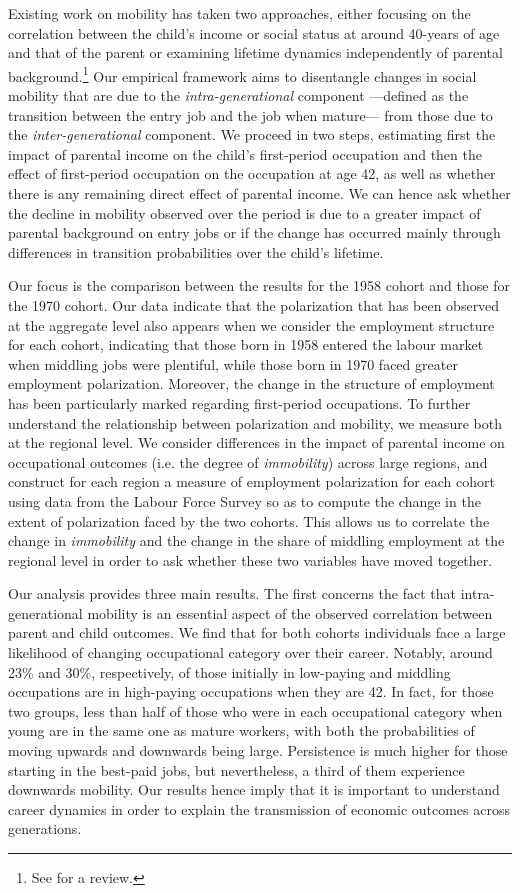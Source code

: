 Existing work on mobility has taken two approaches, either focusing on the correlation between the child's income or social status at around 40-years of age and that of the parent or examining lifetime dynamics independently of parental background.\footnote{See \citet{Jantti2015Income} for a review.} Our empirical framework aims to disentangle changes in social mobility that are due to the \textit{intra-generational} component ---defined as the transition between the entry job and the job when mature--- from those due to the \textit{inter-generational} component. We proceed in two steps, estimating first the impact of parental income on the child's first-period occupation and then the effect of first-period occupation on the occupation at age 42, as well as whether there is any remaining direct effect of parental income. We can hence ask whether the decline in mobility observed over the period is due to a greater impact of parental background on entry jobs or if the change has occurred mainly through differences in transition probabilities over the child's lifetime. 

Our focus is the comparison between the results for the 1958 cohort and those for the 1970 cohort. Our data indicate that the polarization that has been observed at the aggregate level also appears when we consider the employment structure for each cohort, indicating that those born in 1958 entered the labour market when middling jobs were plentiful, while those born in 1970 faced greater employment polarization. Moreover, the change in the structure of employment has been particularly marked regarding first-period occupations. To further understand the relationship between polarization and mobility, we measure both at the regional level. We consider differences in the impact of parental income on occupational outcomes (i.e. the degree of \emph{immobility}) across large regions, and construct for each region a measure of employment polarization for each cohort using data from the Labour Force Survey so as to compute the change in the extent of polarization faced by the two cohorts. This allows us to correlate the change in \emph{immobility} and the change in the share of middling employment at the regional level in order to ask whether these two variables have moved together. 

Our analysis provides three main results. The first concerns the fact that intra-generational mobility is an essential aspect of the observed correlation between parent and child outcomes. We find that for both cohorts individuals face a large likelihood of changing occupational category over their career. Notably, around 23\% and 30\%, respectively, of those initially in low-paying and middling occupations are in high-paying occupations when they are 42. In fact, for those two groups, less than half of those who were in each occupational category when young are in the same one as mature workers, with both the probabilities of moving upwards and downwards being large. Persistence is much higher for those starting in the best-paid jobs, but nevertheless, a third of them experience downwards mobility. Our results hence imply that it is important to understand career dynamics in order to explain the transmission of economic outcomes across generations.

